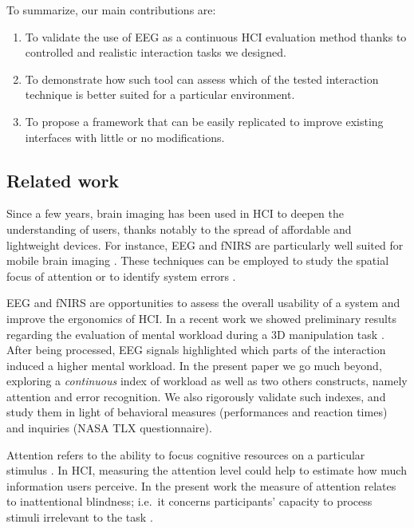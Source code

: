 \documentclass[]{sigchi}
\begin{document}
To summarize, our main contributions are:

\begin{enumerate}
\def\labelenumi{\arabic{enumi}.}
\itemsep1pt\parskip0pt
\item
  To validate the use of EEG as a continuous HCI evaluation method
  thanks to controlled and realistic interaction tasks we designed.
\item
  To demonstrate how such tool can assess which of the tested
  interaction technique is better suited for a particular environment.
\item
  To propose a framework that can be easily replicated to improve
  existing interfaces with little or no modifications.
\end{enumerate}

\subsection{Related work}\label{related-work}

Since a few years, brain imaging has been used in HCI to deepen the
understanding of users, thanks notably to the spread of affordable and
lightweight devices. For instance, EEG and fNIRS are particularly well
suited for mobile brain imaging \citep{Mehta2013, Cutrell2008}. These
techniques can be employed to study the spatial focus of attention
\citep{Trachel2013} or to identify system errors
\citep{Vi2012, putze2015design}.

EEG and fNIRS are opportunities to assess the overall usability of a
system and improve the ergonomics of HCI. In a recent work we showed
preliminary results regarding the evaluation of mental workload during a
3D manipulation task \citep{Wobrock2015}. After being processed, EEG
signals highlighted which parts of the interaction induced a higher
mental workload. In the present paper we go much beyond, exploring a
\emph{continuous} index of workload as well as two others constructs,
namely attention and error recognition. We also rigorously validate such
indexes, and study them in light of behavioral measures (performances
and reaction times) and inquiries (NASA TLX questionnaire).

Attention refers to the ability to focus cognitive resources on a
particular stimulus \citep{Kivikangas2010}. In HCI, measuring the
attention level could help to estimate how much information users
perceive. In the present work the measure of attention relates to
inattentional blindness; i.e.~it concerns participants' capacity to
process stimuli irrelevant to the task \citep{Cartwright-Finch2007}.
\end{document}
